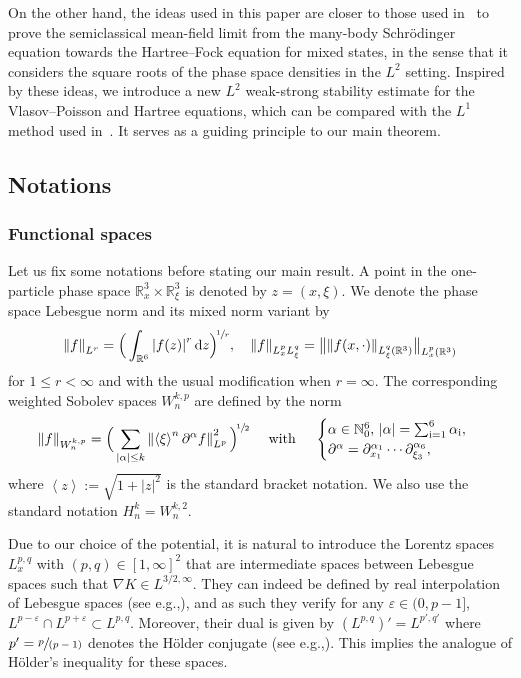 \documentclass[11pt]{article}
\newcommand{\eg}{e.g.,\xspace}
\newcommand{\Subsection}{\subsection}
\newcommand{\spfrac}[2]{\sfrac{#1}{(#2)}}
\theoremstyle{definition}
\newcommand {\N} {\mathbb N}
\newcommand {\RR} {\mathbb R}
\newcommand {\Rd} {\RR^3}
\newcommand {\RRd} {\RR^6}
\let\lt\left
\let\rt\right
\renewcommand {\(} {\lt(}
\renewcommand {\)} {\rt)}
\newcommand {\bangle}[1] {\lt\langle #1\rt\rangle}
\newcommand {\weight}[1] {\bangle{#1}}
\newcommand {\n}[1] {\lt\lvert #1 \rt\rvert}
\newcommand {\nrm}[1] {\lt\lVert #1\rt\rVert}
\newcommand {\bnrm}[1] {\big\lVert #1\big\rVert}
\newcommand {\Nrm}[2] {\nrm{#1}_{#2}}
\newcommand {\bNrm}[2] {\bnrm{#1}_{#2}}
\let\bd\partial
\let\eps\varepsilon
\renewcommand {\d} {\mathop{}\!\mathrm{d}}
\newcommand {\intdd} {\int_{\RRd}}
\newcommand {\ii} {\mathrm{i}}
\begin{document}
On the other hand, the ideas used in this paper are closer to those used in~\cite{benedikter_mean-field_2016-1, chong_many-body_2021} to prove the semiclassical mean-field limit from the many-body Schrödinger equation towards the Hartree--Fock equation for mixed states, in the sense that it considers the square roots of the phase space densities in the $L^2$ setting. Inspired by these ideas, we introduce a new $L^2$ weak-strong stability estimate for the Vlasov--Poisson and Hartree equations, which can be compared with the $L^1$ method used in~\cite{lafleche_strong_2021}. It serves as a guiding principle to our main theorem.

\Subsection{Notations}

\subsubsection{Functional spaces} Let us fix some notations before stating our main result. A point in the one-particle phase space $\Rd_x\times \Rd_{\xi}$ is denoted by $z = (x, \xi)$. We denote the phase space Lebesgue norm and its mixed norm variant by
\begin{equation*}
\Nrm{f}{L^r} = \Big(\intdd \n{f(z)}^r\d z\Big)^{\!\sfrac{1}{r}}, \quad \Nrm{f}{L^p_x L^q_{\xi}} = \bNrm{\!\Nrm{f(x, \cdot)}{L^q_{\xi}(\Rd)}\!}{L^p_x(\Rd)}
\end{equation*}
for $1\le r<\infty$ and with the usual modification when $r=\infty$. The corresponding weighted Sobolev spaces $W^{k,p}_n$ are defined by the norm
\begin{equation*}
\Nrm{f}{W^{k,p}_{n}} = \Big(\sum_{\substack{ \n{\alpha} \le k}}\Nrm{\weight{\xi}^n\partial^\alpha f}{L^{p}}^2\Big)^{\!\sfrac{1}{2}}\quad \text{ with }\quad
\begin{cases}
\alpha \in {\N_{0}^6},\, \n{\alpha}= \sum^6_{\ii=1} \alpha_{\ii},
\\
\bd^\alpha = \bd_{x_1}^{\alpha_1}\cdots \bd_{\xi_3}^{\alpha_6},
\end{cases}
\end{equation*}
where $\weight{z}:=\sqrt{1+|z|^2}$ is the standard bracket notation. We also use the standard notation $H^{k}_{n} = W^{k,2}_{n}$.

Due to our choice of the potential, it is natural to introduce the Lorentz spaces $L^{p,q}_x$ with $(p,q)\in[1,\infty]^2$ that are intermediate spaces between Lebesgue spaces such that $\nabla K \in L^{3/2,\infty}$. They can indeed be defined by real interpolation of Lebesgue spaces (see \eg \cite[Th.\,5.3.1]{bergh_interpolation_1976}), and as such they verify for any $\eps\in(0,p-1]$, $L^{p-\eps} \cap L^{p+\eps} \subset L^{p,q}$. Moreover, their dual is given by $(L^{p,q})' = L^{p',q'}$ where $p' = \spfrac{p}{p-1}$ denotes the Hölder conjugate (see \eg \cite{hunt_lpq_1966}). This implies the analogue of Hölder's inequality for these spaces.
\end{document}
